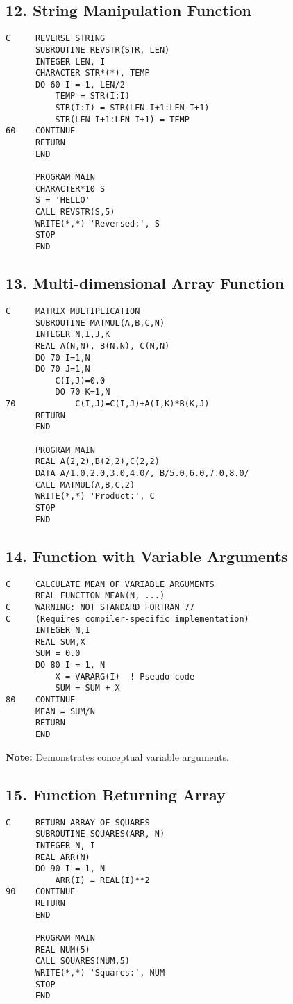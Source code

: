 \documentclass{book}
\begin{document}
\subsection*{12. String Manipulation Function}
\begin{verbatim}
C     REVERSE STRING
      SUBROUTINE REVSTR(STR, LEN)
      INTEGER LEN, I
      CHARACTER STR*(*), TEMP
      DO 60 I = 1, LEN/2
          TEMP = STR(I:I)
          STR(I:I) = STR(LEN-I+1:LEN-I+1)
          STR(LEN-I+1:LEN-I+1) = TEMP
60    CONTINUE
      RETURN
      END

      PROGRAM MAIN
      CHARACTER*10 S
      S = 'HELLO'
      CALL REVSTR(S,5)
      WRITE(*,*) 'Reversed:', S
      STOP
      END
\end{verbatim}

\subsection*{13. Multi-dimensional Array Function}
\begin{verbatim}
C     MATRIX MULTIPLICATION
      SUBROUTINE MATMUL(A,B,C,N)
      INTEGER N,I,J,K
      REAL A(N,N), B(N,N), C(N,N)
      DO 70 I=1,N
      DO 70 J=1,N
          C(I,J)=0.0
          DO 70 K=1,N
70            C(I,J)=C(I,J)+A(I,K)*B(K,J)
      RETURN
      END

      PROGRAM MAIN
      REAL A(2,2),B(2,2),C(2,2)
      DATA A/1.0,2.0,3.0,4.0/, B/5.0,6.0,7.0,8.0/
      CALL MATMUL(A,B,C,2)
      WRITE(*,*) 'Product:', C
      STOP
      END
\end{verbatim}

\subsection*{14. Function with Variable Arguments}
\begin{verbatim}
C     CALCULATE MEAN OF VARIABLE ARGUMENTS
      REAL FUNCTION MEAN(N, ...)
C     WARNING: NOT STANDARD FORTRAN 77
C     (Requires compiler-specific implementation)
      INTEGER N,I
      REAL SUM,X
      SUM = 0.0
      DO 80 I = 1, N
          X = VARARG(I)  ! Pseudo-code
          SUM = SUM + X
80    CONTINUE
      MEAN = SUM/N
      RETURN
      END
\end{verbatim}
\textbf{Note:} Demonstrates conceptual variable arguments.

\subsection*{15. Function Returning Array}
\begin{verbatim}
C     RETURN ARRAY OF SQUARES
      SUBROUTINE SQUARES(ARR, N)
      INTEGER N, I
      REAL ARR(N)
      DO 90 I = 1, N
          ARR(I) = REAL(I)**2
90    CONTINUE
      RETURN
      END

      PROGRAM MAIN
      REAL NUM(5)
      CALL SQUARES(NUM,5)
      WRITE(*,*) 'Squares:', NUM
      STOP
      END
\end{verbatim}
\end{document}
